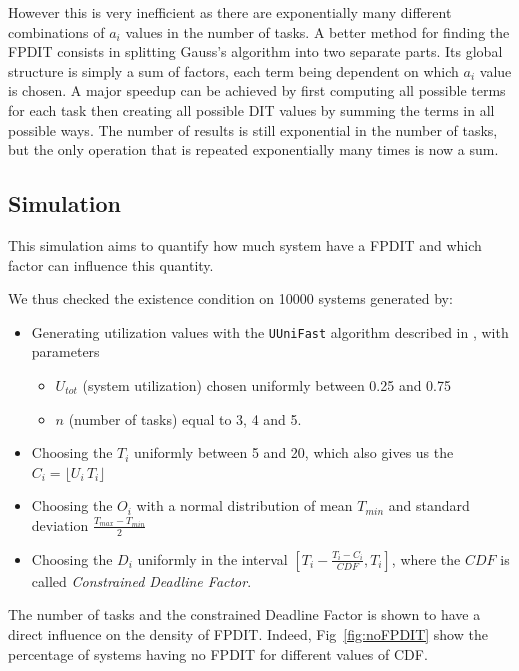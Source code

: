 \documentclass[conference]{IEEEtran}
\begin{document}
		However this is very inefficient as there are exponentially many different
		combinations of $a_i$ values in the number of tasks. A better method for finding the FPDIT consists in splitting Gauss's
		algorithm into two separate parts. Its global structure is simply a sum of
		factors, each term being dependent on which $a_i$ value is chosen. A major speedup can
		be achieved by first computing all possible terms for each task then creating all
		possible DIT values by summing the terms in all possible ways. The number of results is still
		exponential in the number of tasks, but the only operation that is repeated
		exponentially many times is now a sum.

	\subsection{Simulation}

	This simulation aims to quantify how much system have a FPDIT and which factor can influence this quantity.

	We thus checked the existence condition on 10000 systems generated by:
	\begin{itemize}
		\item Generating utilization values with the \texttt{UUniFast} algorithm described in \cite{bini2005measuring}, with parameters
		\begin{itemize}
			\item $U_{tot}$ (system utilization) chosen uniformly between 0.25 and 0.75
			\item $n$ (number of tasks) equal to 3, 4 and 5.
		\end{itemize}
		\item Choosing the $T_i$ uniformly between 5 and 20, which also gives us the $C_i = \lfloor U_i \, T_i \rfloor$
		\item Choosing the $O_i$ with a normal distribution of mean $T_{min}$ and standard deviation $\frac{T_{max} - T_{min}}{2}$
		\item Choosing the $D_i$ uniformly in the interval $[T_i - \frac{T_i - C_i}{CDF}, T_i]$, where the $CDF$ is called \emph{Constrained Deadline Factor}.
	\end{itemize}

	The number of tasks and the constrained Deadline Factor is shown to have a direct influence on the density of FPDIT. Indeed, Fig~\ref{fig:noFPDIT} show the percentage of systems having no FPDIT for different values of CDF.
\end{document}
